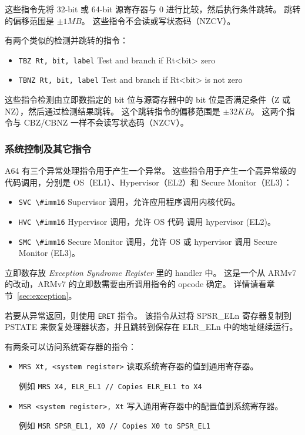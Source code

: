 这些指令先将 32-bit 或 64-bit 源寄存器与 0 进行比较，然后执行条件跳转。
跳转的偏移范围是 $\pm1MB$。
这些指令不会读或写状态码（NZCV）。

有两个类似的检测并跳转的指令：

\begin{itemize}
  \item \lstinline!TBZ Rt, bit, label! \quad Test and branch if Rt<bit> zero
  \item \lstinline!TBNZ Rt, bit, label! \quad Test and branch if Rt<bit> is not zero
\end{itemize}

这些指令检测由立即数指定的 bit 位与源寄存器中的 bit 位是否满足条件（Z 或 NZ），然后通过检测结果跳转。
这个跳转指令的偏移范围是 $\pm32KB$。
这两个指令与 CBZ/CBNZ 一样不会读写状态码（NZCV）。

\subsubsection{系统控制及其它指令}


A64 有三个异常处理指令用于产生一个异常。
这些指令用于产生一个高异常级的代码调用，分别是 OS（EL1）、Hypervisor（EL2）和 Secure Monitor（EL3）：

\begin{itemize}
  \item \lstinline!SVC \#imm16! \quad Supervisor 调用，允许应用程序调用内核代码。
  \item \lstinline!HVC \#imm16! \quad Hypervisor 调用，允许 OS 代码 调用 hypervisor (EL2)。
  \item \lstinline!SMC \#imm16! \quad Secure Monitor 调用，允许 OS 或 hypervisor 调用 Secure Monitor (EL3)。
\end{itemize}

立即数存放 \textit{Exception Syndrome Register} 里的 handler 中。
这是一个从 ARMv7 的改动，ARMv7 的立即数需要由所调用指令的 opcode 确定。
详情请看章节~\ref{sec:exception}。

若要从异常返回，则使用 \lstinline!ERET! 指令。
该指令从过将 SPSR\_ELn 寄存器复制到 PSTATE 来恢复处理器状态，并且跳转到保存在 ELR\_ELn 中的地址继续运行。


有两条可以访问系统寄存器的指令：
\begin{itemize}
  \item \lstinline!MRS Xt, <system register>! \quad 读取系统寄存器的值到通用寄存器。

    例如 \lstinline!MRS X4, ELR_EL1 // Copies ELR_EL1 to X4!
  \item \lstinline!MSR <system register>, Xt! \quad 写入通用寄存器中的配置值到系统寄存器。

    例如 \lstinline!MSR SPSR_EL1, X0 // Copies X0 to SPSR_EL1!
\end{itemize}


